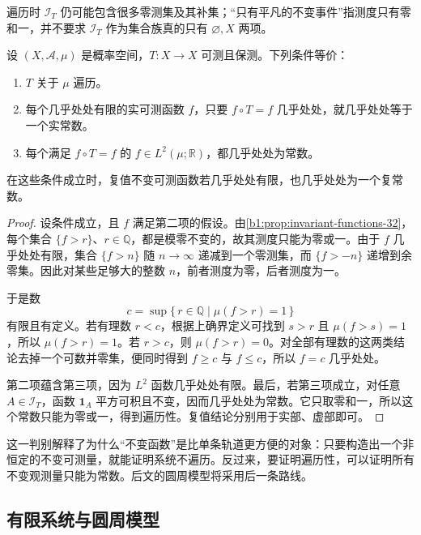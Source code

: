 遍历时 \(\mathcal I_T\) 仍可能包含很多零测集及其补集；“只有平凡的不变事件”指测度只有零和一，并不要求 \(\mathcal I_T\) 作为集合族真的只有 \(\varnothing,X\) 两项。

\begin{proposition}[遍历性的函数判别]\label{b1:prop:ergodicity-criterion-32}
设 \((X,\mathcal A,\mu)\) 是概率空间，\(T\colon X\rightarrow X\) 可测且保测。下列条件等价：
\begin{enumerate}[label=\Roman*.]
 \item\label{b1:item:ergodic-events-32}\(T\) 关于 \(\mu\) 遍历。
 \item\label{b1:item:ergodic-functions-32}每个几乎处处有限的实可测函数 \(f\)，只要 \(f\circ T=f\) 几乎处处，就几乎处处等于一个实常数。
 \item\label{b1:item:ergodic-l2-32}每个满足 \(f\circ T=f\) 的 \(f\in L^2(\mu;\mathbb R)\)，都几乎处处为常数。
\end{enumerate}
在这些条件成立时，复值不变可测函数若几乎处处有限，也几乎处处为一个复常数。
\end{proposition}
\begin{proof}
设条件成立，且 \(f\) 满足第二项的假设。由\cref{b1:prop:invariant-functions-32}，每个集合 \(\{f>r\}\)、\(r\in\mathbb Q\)，都是模零不变的，故其测度只能为零或一。由于 \(f\) 几乎处处有限，集合 \(\{f>n\}\) 随 \(n\to\infty\) 递减到一个零测集，而 \(\{f>-n\}\) 递增到余零集。因此对某些足够大的整数 \(n\)，前者测度为零，后者测度为一。

于是数
\[
 c=\sup\{\,r\in\mathbb Q\mid\mu(f>r)=1\,\}
\]
有限且有定义。若有理数 \(r<c\)，根据上确界定义可找到 \(s>r\) 且 \(\mu(f>s)=1\)，所以 \(\mu(f>r)=1\)。若 \(r>c\)，则 \(\mu(f>r)=0\)。对全部有理数的这两类结论去掉一个可数并零集，便同时得到 \(f\geq c\) 与 \(f\leq c\)，所以 \(f=c\) 几乎处处。

第二项蕴含第三项，因为 \(L^2\) 函数几乎处处有限。最后，若第三项成立，对任意 \(A\in\mathcal I_T\)，函数 \(\mathbf1_A\) 平方可积且不变，因而几乎处处为常数。它只取零和一，所以这个常数只能为零或一，得到遍历性。复值结论分别用于实部、虚部即可。
\end{proof}

这一判别解释了为什么“不变函数”是比单条轨道更方便的对象：只要构造出一个非恒定的不变可测量，就能证明系统不遍历。反过来，要证明遍历性，可以证明所有不变观测量只能为常数。后文的圆周模型将采用后一条路线。

\subsection{有限系统与圆周模型}
\label{b1:subsec:320104}

